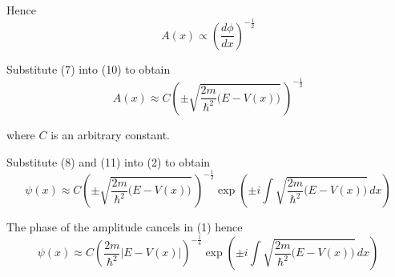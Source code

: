 Hence
\begin{equation*}
A(x)\propto\left(\frac{d\phi}{dx}\right)^{-\frac{1}{2}}
\tag{10}
\end{equation*}

Substitute (7) into (10) to obtain
\begin{equation*}
A(x)\approx C
\left(\pm\sqrt{\frac{2m}{\hbar^2}\bigl(E-V(x)\bigr)}\,\right)^{-\frac{1}{2}}
\tag{11}
\end{equation*}

where $C$ is an arbitrary constant.

\bigskip
Substitute (8) and (11) into (2) to obtain
\begin{equation*}
\psi(x)\approx C
\left(\pm\sqrt{\frac{2m}{\hbar^2}\bigl(E-V(x)\bigr)}\,\right)^{-\frac{1}{2}}
\exp\left(\pm i\int\sqrt{\frac{2m}{\hbar^2}\bigl(E-V(x)\bigr)}\,dx\right)
\end{equation*}

The phase of the amplitude cancels in (1) hence
\begin{equation*}
\psi(x)\approx C
\left(\frac{2m}{\hbar^2}\bigl|E-V(x)\bigr|\right)^{-\frac{1}{4}}
\exp\left(\pm i\int\sqrt{\frac{2m}{\hbar^2}\bigl(E-V(x)\bigr)}\,dx\right)
\end{equation*}


